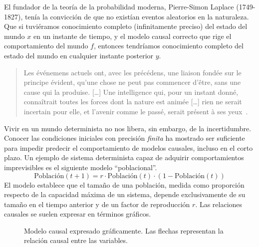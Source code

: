 \documentclass[a4paper,11pt]{book}
\theoremstyle{definition}
\begin{document}

El fundador de la teoría de la probabilidad moderna, Pierre-Simon Laplace (1749-1827), tenía la convicción de que no existían eventos aleatorios en la naturaleza.
%
Que si tuviéramos conocimiento completo (infinitamente preciso) del estado del mundo $x$ en un instante de tiempo, y el modelo causal correcto que rige el comportamiento del mundo $f$, entonces tendríamos conocimiento completo del estado del mundo en cualquier instante posterior $y$.

\begin{quotation}
Les événemens actuels ont, avec les précédens, une liaison fondée sur le principe évident, qu’une chose ne peut pas commencer d’être, sans une cause qui la produise. [\dots] Une intelligence qui, pour un instant donné, connaîtrait toutes les forces dont la nature est animée [\dots] rien ne serait incertain pour elle, et l’avenir comme le passé, serait présent à ses yeux~\cite{laplace1816-philosophique}. \end{quotation}

Vivir en un mundo determinista no nos libera, sin embargo, de la incertidumbre.
%
Conocer las condiciones iniciales con precisión \emph{finita} ha mostrado ser suficiente para impedir predecir el comportamiento de modelos causales, incluso en el corto plazo.
%
Un ejemplo de sistema determinista capaz de adquirir comportamientos imprevisibles es el siguiente modelo ``poblacional''.
%
\begin{equation}
 \text{Población}(t+1) = r \cdot \text{Población}(t)\cdot (1-\text{Población}(t))
\end{equation}
%
El modelo establece que el tama\~no de una población, medida como proporción respecto de la capacidad máxima de un sistema, depende exclusivamente de su tama\~no en el tiempo anterior y de un factor de reproducción $r$.
%
Las relaciones causales se suelen expresar en términos gráficos.


\begin{figure}[ht!]
\centering
{}
\caption{Modelo causal expresado gráficamente. Las flechas representan la relación causal entre las variables. }
\label{fig:modelo_poblacional}
\end{figure}
\end{document}
